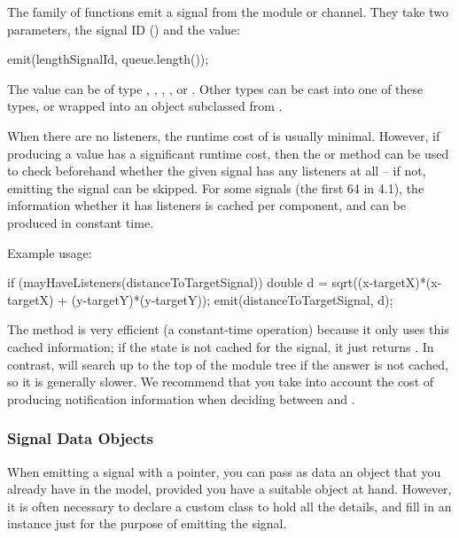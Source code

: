 The  family of functions emit a signal from the module or
channel. They take two parameters, the signal ID () and
the value:

\begin{cpp}
emit(lengthSignalId, queue.length());
\end{cpp}

The value can be of type , , ,
, or . Other types can be cast into
one of these types, or wrapped into an object subclassed from .

When there are no listeners, the runtime cost of  is usually minimal.
However, if producing a value has a significant runtime cost, then the
 or  method can be used
to check beforehand whether the given signal has any listeners at all --
if not, emitting the signal can be skipped. For some signals (the first 64
in {\opp} 4.1), the information whether it has listeners is cached per
component, and can be produced in constant time.

Example usage:

\begin{cpp}
if (mayHaveListeners(distanceToTargetSignal))
{
    double d = sqrt((x-targetX)*(x-targetX) + (y-targetY)*(y-targetY));
    emit(distanceToTargetSignal, d);
}
\end{cpp}

The  method is very efficient (a constant-time
operation) because it only uses this cached information; if the state is
not cached for the signal, it just returns . In contrast,
 will search up to the top of the module tree if
the answer is not cached, so it is generally slower. We recommend that
you take into account the cost of producing notification information when
deciding between  and .


\subsubsection{Signal Data Objects}

When emitting a signal with a  pointer, you can pass as data
an object that you already have in the model, provided you have a suitable
object at hand. However, it is often necessary to declare a custom class
to hold all the details, and fill in an instance just for the purpose of
emitting the signal.

